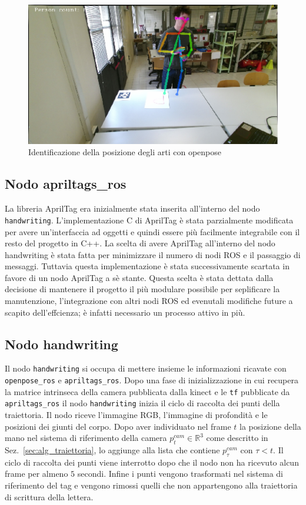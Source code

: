 \documentclass[10pt,twocolumn]{article}
\newcommand{\Sec}[1]{Sez.~\ref{#1}}
\begin{document}
  \begin{figure}[h]
    \centering
    \includegraphics[width=\linewidth]{immagini/openpose_person_detection.png}
    \caption{Identificazione della posizione degli arti con openpose}
    \label{f:person_detection}
  \end{figure}

  \subsection{Nodo apriltags\_ros}
  La libreria AprilTag era inizialmente stata inserita all'interno del nodo
  \verb|handwriting|. L'implementazione C di AprilTag è stata parzialmente
  modificata per avere un'interfaccia ad oggetti e quindi essere più facilmente
  integrabile con il resto del progetto in C++. La scelta di avere AprilTag
  all'interno del nodo handwriting è stata fatta per minimizzare il numero di
  nodi ROS e il passaggio di messaggi. Tuttavia questa implementazione è stata
  successivamente scartata in favore di un nodo AprilTag a sè stante. Questa
  scelta è stata dettata dalla decisione di mantenere il progetto il più
  modulare possibile per seplificare la manutenzione, l'integrazione con altri
  nodi ROS ed evenutali modifiche future a scapito dell'effcienza; è infatti
  necessario un processo attivo in più.

  \subsection{Nodo handwriting}
  Il nodo \verb|handwriting| si occupa di mettere insieme le informazioni
  ricavate con \verb|openpose_ros| e \verb|apriltags_ros|. Dopo una fase di
  inizializzazione in cui recupera la matrice intrinseca della camera pubblicata
  dalla kinect e le \verb|tf| pubblicate da \verb|apriltags_ros| il nodo
  \verb|handwriting| inizia il ciclo di raccolta dei punti della traiettoria. Il
  nodo riceve l'immagine RGB, l'immagine di profondità e le posizioni dei giunti
  del corpo. Dopo aver individuato nel frame $t$ la posizione della mano nel
  sistema di riferimento della camera $p^{cam}_t \in \mathbb{R}^3$ come
  descritto in \Sec{sec:alg_traiettoria}, lo aggiunge alla lista che contiene
  $p^{cam}_\tau$ con $\tau < t$. Il ciclo di raccolta dei punti viene interrotto
  dopo che il nodo non ha ricevuto alcun frame per almeno $5$ secondi. Infine i
  punti vengono trasformati nel sistema di riferimento del tag e vengono rimossi
  quelli che non appartengono alla traiettoria di scrittura della lettera.
\end{document}
